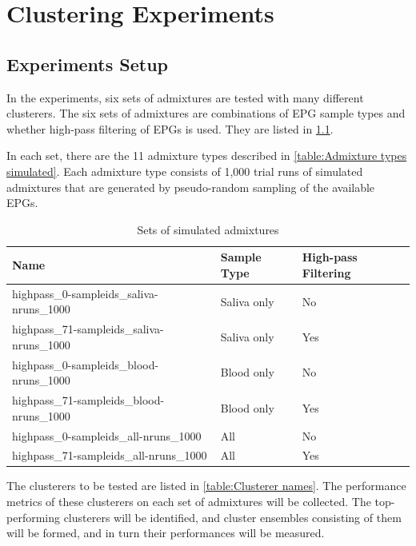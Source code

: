 
\chapter{Clustering Experiments}
\label{ch:Clustering Experiments}
\thispagestyle{myheadings}

\section{Experiments Setup}

In the experiments, six sets of admixtures are tested with many different clusterers. The six sets of admixtures are combinations of EPG sample types and whether high-pass filtering of EPGs is used. They are listed in \cref{table:Sets of simulated admixtures}.

In each set, there are the 11 admixture types described in \cref{table:Admixture types simulated}. Each admixture type consists of 1,000 trial runs of simulated admixtures that are generated by pseudo-random sampling of the available EPGs.

\begin{table}[htbp]
\centering
\begin{tabular}{lll}
\toprule
                                   Name & Sample Type & High-pass Filtering \\
\midrule
 highpass\_0-sampleids\_saliva-nruns\_1000 & Saliva only &                  No \\
highpass\_71-sampleids\_saliva-nruns\_1000 & Saliva only &                 Yes \\
  highpass\_0-sampleids\_blood-nruns\_1000 &  Blood only &                  No \\
 highpass\_71-sampleids\_blood-nruns\_1000 &  Blood only &                 Yes \\
    highpass\_0-sampleids\_all-nruns\_1000 &         All &                  No \\
   highpass\_71-sampleids\_all-nruns\_1000 &         All &                 Yes \\
\bottomrule
\end{tabular}
\caption{Sets of simulated admixtures}
\label{table:Sets of simulated admixtures}
\end{table}

The clusterers to be tested are listed in \cref{table:Clusterer names}. The performance metrics of these clusterers on each set of admixtures will be collected. The top-performing clusterers will be identified, and cluster ensembles consisting of them will be formed, and in turn their performances will be measured.

